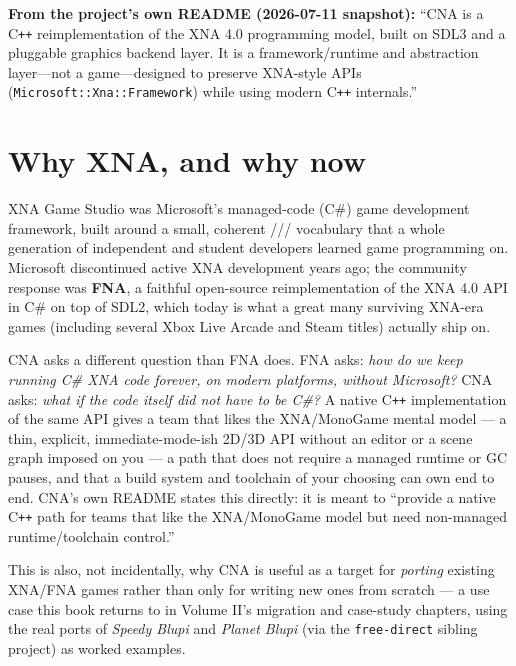 \begin{sourcenote}
\textbf{From the project's own README (2026-07-11 snapshot):} ``CNA is a C\texttt{++}
reimplementation of the XNA 4.0 programming model, built on SDL3 and a pluggable graphics
backend layer. It is a framework/runtime and abstraction layer---not a game---designed to
preserve XNA-style APIs (\texttt{Microsoft::Xna::Framework}) while using modern C\texttt{++}
internals.''
\end{sourcenote}

\section{Why XNA, and why now}

XNA Game Studio was Microsoft's managed-code (C\#) game development framework, built around
a small, coherent ///
vocabulary that a whole generation of independent and student developers learned game
programming on. Microsoft discontinued active XNA development years ago; the community
response was \textbf{FNA}, a faithful open-source reimplementation of the XNA 4.0 API in
C\# on top of SDL2, which today is what a great many surviving XNA-era games (including
several Xbox Live Arcade and Steam titles) actually ship on.

CNA asks a different question than FNA does. FNA asks: \emph{how do we keep running C\#
XNA code forever, on modern platforms, without Microsoft?} CNA asks: \emph{what if the code
itself did not have to be C\#?} A native C\texttt{++} implementation of the same API gives a
team that likes the XNA/MonoGame mental model --- a thin, explicit, immediate-mode-ish 2D/3D
API without an editor or a scene graph imposed on you --- a path that does not require a
managed runtime or GC pauses, and that a build system and toolchain of your choosing can
own end to end. CNA's own README states this directly: it is meant to ``provide a native
C\texttt{++} path for teams that like the XNA/MonoGame model but need non-managed
runtime/toolchain control.''

This is also, not incidentally, why CNA is useful as a target for \emph{porting} existing
XNA/FNA games rather than only for writing new ones from scratch --- a use case this book
returns to in Volume II's migration and case-study chapters, using the real ports of
\emph{Speedy Blupi} and \emph{Planet Blupi} (via the \texttt{free-direct} sibling project)
as worked examples.

